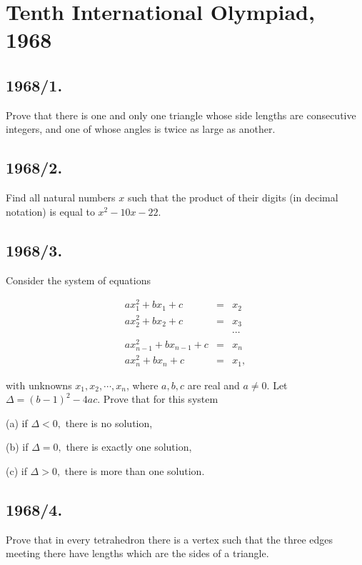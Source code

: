 \documentclass[12pt,thmsa]{article}
\begin{document}
\section{Tenth International Olympiad, 1968}

\subsection{1968/1.}

Prove that there is one and only one triangle whose side lengths are
consecutive integers, and one of whose angles is twice as large as another.

\subsection{1968/2.}

Find all natural numbers $x$ such that the product of their digits (in
decimal notation) is equal to $x^{2}-10x-22.$

\subsection{1968/3.}

Consider the system of equations

\begin{eqnarray*}
ax_{1}^{2}+bx_{1}+c &=&x_{2} \\
ax_{2}^{2}+bx_{2}+c &=&x_{3} \\
&&\cdots  \\
ax_{n-1}^{2}+bx_{n-1}+c &=&x_{n} \\
ax_{n}^{2}+bx_{n}+c &=&x_{1},
\end{eqnarray*}

with unknowns $x_{1},x_{2},\cdots ,x_{n}$, where $a,b,c$ are real and $a\neq
0.$ Let $\Delta =(b-1)^{2}-4ac.$ Prove that for this system

(a) if $\Delta <0,$ there is no solution,

(b) if $\Delta =0,$ there is exactly one solution,

(c) if $\Delta >0,$ there is more than one solution.

\subsection{1968/4.}

Prove that in every tetrahedron there is a vertex such that the three edges
meeting there have lengths which are the sides of a triangle.
\end{document}

